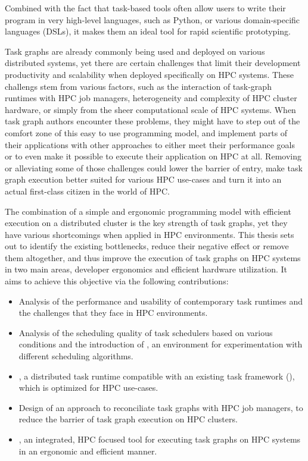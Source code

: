 Combined with the fact that task-based tools often allow users to write their program in very
high-level languages, such as Python, or various domain-specific languages (DSLs), it makes them an
ideal tool for rapid scientific prototyping.

Task graphs are already commonly being used and deployed on various distributed
systems, yet there are certain challenges that limit their development
productivity and scalability when deployed specifically on HPC systems. These challengs stem from
various factors, such as the interaction of task-graph runtimes with HPC job managers,
heterogeneity and complexity of HPC cluster hardware, or simply from the sheer computational scale
of HPC systems. When task graph authors encounter these problems, they might have to step out of
the comfort zone of this easy to use programming model, and implement parts of their applications
with other approaches to either meet their performance goals or to even make it possible to execute
their application on HPC at all. Removing or alleviating some of those challenges could lower the
barrier of entry, make task graph execution better suited for various HPC use-cases and turn it
into an actual first-class citizen in the world of HPC\@.

The combination of a simple and ergonomic programming model with efficient execution on a
distributed cluster is the key strength of task graphs, yet they have various shortcomings when
applied in HPC environments. This thesis sets out to identify the existing bottlenecks, reduce
their negative effect or remove them altogether, and thus improve the execution of task graphs on
HPC systems in two main areas, developer ergonomics and efficient hardware utilization. It aims to
achieve this objective via the following contributions:
\begin{itemize}
	\item Analysis of the performance and usability of contemporary task runtimes and the challenges that
	      they face in HPC environments.
	\item Analysis of the scheduling quality of task schedulers based on various conditions and the
	      introduction of \estee{}, an environment for experimentation with different scheduling
	      algorithms.
	\item \rsds{}, a distributed task runtime compatible with an existing task framework
	      (\dask{}), which is optimized for HPC use-cases.
	\item Design of an approach to reconciliate task graphs with HPC job managers, to reduce the barrier of
	      task graph execution on HPC clusters.
	\item \hyperqueue{}, an integrated, HPC focused tool for executing task graphs on HPC systems
	      in an ergonomic and efficient manner.
\end{itemize}

